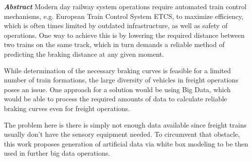 \clearpage

\par\noindent
\emph{\textbf{Abstract}} Modern day railway system operations require automated train control mechanisms, e.g. European Train Control System ETCS, to maximize efficiency, which is often times limited by outdated infrastructure, as well as safety of operations. One way to achieve this is by lowering the required distance between two trains on the same track, which in turn demands a reliable method of predicting the braking distance at any given moment. 
\par
While determination of the necessary braking curves is feasible for a limited number of train formations, the large diversity of vehicles in freight operations poses an issue. One approach for a solution would be using Big Data, which would be able to process the required amounts of data to calculate reliable braking curves even for freight operations. 
\par
The problem here is there is simply not enough data available since freight trains usually don't have the sensory equipment needed. To circumvent that obstacle, this work proposes generation of artificial data via white box modeling to be then used in further big data operations.